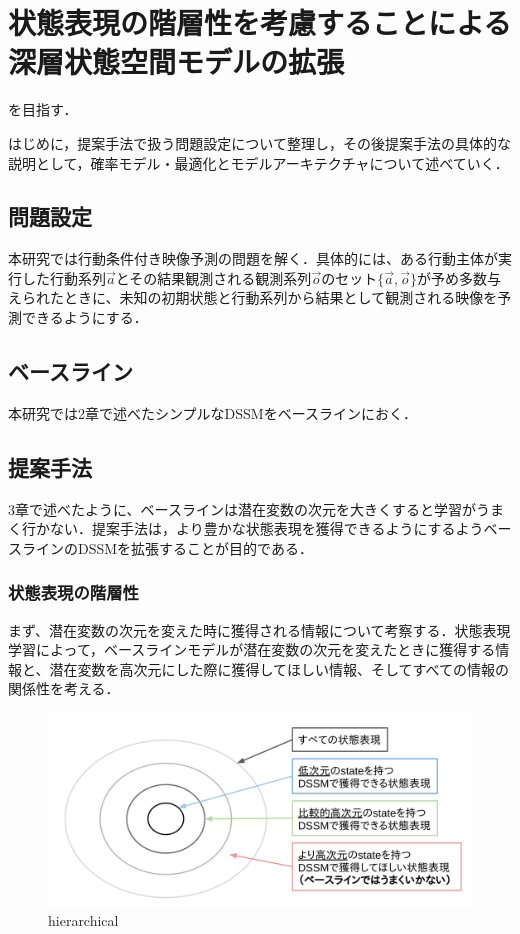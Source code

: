 \chapter{状態表現の階層性を考慮することによる深層状態空間モデルの拡張}
\label{chap:proposal}
を目指す．

はじめに，提案手法で扱う問題設定について整理し，その後提案手法の具体的な説明として，確率モデル・最適化とモデルアーキテクチャについて述べていく．

\section{問題設定}
本研究では行動条件付き映像予測の問題を解く．具体的には、ある行動主体が実行した行動系列$\vec{a}$とその結果観測される観測系列$\vec{o}$のセット$\{\vec{a}, \vec{o}\}$が予め多数与えられたときに、未知の初期状態と行動系列から結果として観測される映像を予測できるようにする．

\section{ベースライン}
本研究では2章で述べたシンプルなDSSMをベースラインにおく．

\section{提案手法}
3章で述べたように、ベースラインは潜在変数の次元を大きくすると学習がうまく行かない．提案手法は，より豊かな状態表現を獲得できるようにするようベースラインのDSSMを拡張することが目的である．

\subsection{状態表現の階層性}
まず、潜在変数の次元を変えた時に獲得される情報について考察する．状態表現学習によって，ベースラインモデルが潜在変数の次元を変えたときに獲得する情報と、潜在変数を高次元にした際に獲得してほしい情報、そしてすべての情報の関係性を考える．

\begin{figure}[tbp]
    \begin{center}
      \includegraphics[width=\linewidth]{./figures/hierarchical.png}
      \caption{hierarchical}
      \label{fig:hierarchical}
    \end{center}
  \end{figure}

